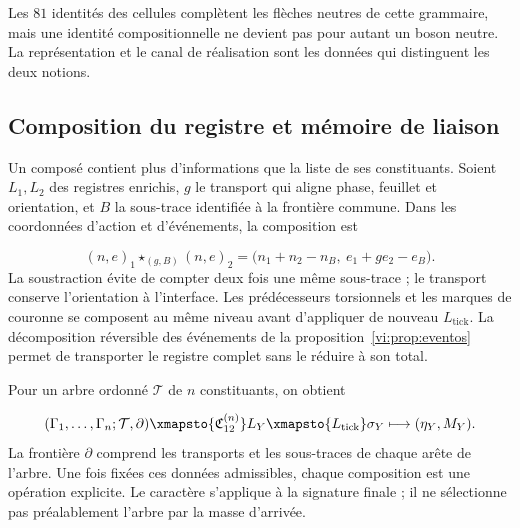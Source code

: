 Les \(81\) identités des cellules complètent les flèches neutres
de cette grammaire, mais une identité compositionnelle ne devient pas pour
autant un boson neutre. La représentation et le canal de réalisation
sont les données qui distinguent les deux notions.


\subsection{Composition du registre et mémoire de liaison
}
\label{vi:subsec:composicion-registro}

Un composé contient plus d’informations que la liste de ses
constituants. Soient \(L_1,L_2\) des registres enrichis, \(g\) le
transport qui aligne phase, feuillet et orientation, et \(B\) la sous-trace
identifiée à la frontière commune. Dans les coordonnées d’action et
d’événements, la composition est

\begin{equation}
 (n,e)_1\star_{(g,B)}(n,e)_2
 =\bigl(n_1+n_2-n_B,\ e_1+ge_2-e_B\bigr).
 \label{vi:eq:composicion-frontera}
\end{equation}
La soustraction évite de compter deux fois une même sous-trace ; le transport
conserve l’orientation à l’interface. Les prédécesseurs torsionnels et
les marques de couronne se composent au même niveau avant d’appliquer de nouveau
\(L_{\mathrm{tick}}\). La décomposition réversible des événements
de la proposition~\ref{vi:prop:eventos} permet de transporter le registre
complet sans le réduire à son total.


Pour un arbre ordonné \(\mathcal T\) de \(n\) constituants, on obtient

\begin{equation}
 (\Gamma_1,\ldots,\Gamma_n;\mathcal T,\partial)
 \xmapsto{\mathfrak C_{12}^{(n)}}L_Y
 \xmapsto{L_{\mathrm{tick}}}\sigma_Y
 \longmapsto (\eta_Y,M_Y).
 \label{vi:eq:cadena-compuesto}
\end{equation}
La frontière \(\partial\) comprend les transports et les sous-traces de chaque
arête de l’arbre. Une fois fixées ces données admissibles, chaque composition
est une opération explicite. Le caractère s’applique à la signature finale ;
il ne sélectionne pas préalablement l’arbre par la masse d’arrivée.


